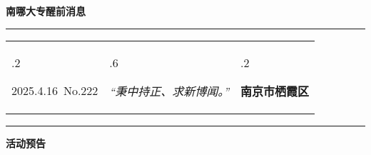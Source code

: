 \documentclass[letterpaper, 12pt]{article}
\begin{document}
\begin{center}
    \Huge\textbf{南哪大专醒前消息}
\end{center}
\vspace{4mm}
\hrule
\renewcommand\tabularxcolumn[1]{m{#1}}
\begin{tabularx}{\textwidth}{>{\hsize.2\hsize}X>{\hsize.6\hsize}X>{\hsize.2\hsize}X}
    \begin{flushleft}
        2025.4.16\, No.222
    \end{flushleft}
    &
    \begin{center}
        \textit{“秉中持正、求新博闻。”}
    \end{center}
    &
    \begin{flushright}
        \textbf{南京市栖霞区}
    \end{flushright}
\end{tabularx}
\vspace{-3.5mm}
\hrule
\vspace{4mm}
\centerline{\huge\textbf{活动预告}}
\end{document}
